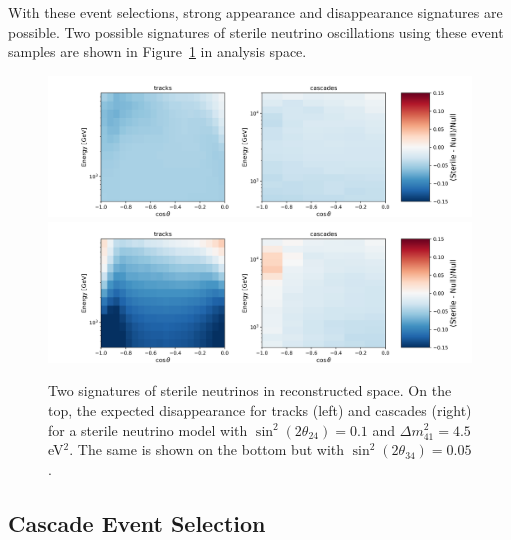 \documentclass[main.tex]{subfiles}
\begin{document}
With these event selections, strong appearance and disappearance signatures are possible. 
Two possible signatures of sterile neutrino oscillations using these event samples are shown in Figure~\ref{fig:sterile_signature} in analysis space. 

\begin{figure}
    \centering
    \includegraphics[width=0.85\linewidth]{figures/meows_bf_nofit.png}\\
    \includegraphics[width=0.85\linewidth]{figures/with_th34_nofit.png}
    \caption{Two signatures of sterile neutrinos in reconstructed space. On the top, the expected disappearance for tracks (left) and cascades (right) for a sterile neutrino model with $\sin^{2}(2\theta_{24})=0.1$ and $\Delta m_{41}^{2}=4.5$ eV$^{2}$. The same is shown on the bottom but with $\sin^{2}(2\theta_{34})=0.05$.}\label{fig:sterile_signature}
\end{figure}

\subsection{Cascade Event Selection}
\end{document}
